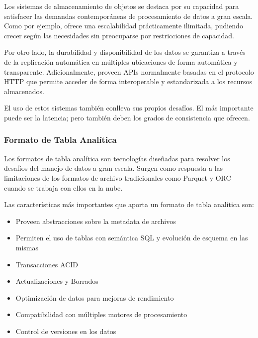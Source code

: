 Los sistemas de almacenamiento de objetos se destaca por su capacidad para satisfacer las demandas contemporáneas de procesamiento de datos a gran escala.
Como por ejemplo, ofrece una escalabilidad prácticamente ilimitada, pudiendo crecer según las necesidades sin preocuparse por restricciones de capacidad.\newline

Por otro lado, la durabilidad y disponibilidad de los datos se garantiza a través de la replicación automática en múltiples ubicaciones de forma automática y transparente.
Adicionalmente, proveen APIs normalmente basadas en el protocolo HTTP que permite acceder de forma interoperable y estandarizada a los recursos almacenados.\newline

El uso de estos sistemas también conlleva sus propios desafíos. El más importante puede ser la latencia; pero también deben los grados de consistencia que ofrecen.

\clearpage

\subsubsection{Formato de Tabla Analítica}

Los formatos de tabla analítica son tecnologías diseñadas para resolver los desafíos del manejo de datos
a gran escala. Surgen como respuesta a las limitaciones de los formatos de archivo tradicionales como Parquet y ORC
cuando se trabaja con ellos en la nube. \newline

Las características más importantes que aporta un formato de tabla analítica son:

\begin{itemize}
    \item Proveen abstracciones sobre la metadata de archivos
    \item Permiten el uso de tablas con semántica SQL y evolución de esquema en las mismas
    \item Transacciones ACID
    \item Actualizaciones y Borrados
    \item Optimización de datos para mejoras de rendimiento
    \item Compatibilidad con múltiples motores de procesamiento
    \item Control de versiones en los datos
\end{itemize}

